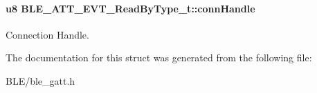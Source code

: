 \paragraph[{\texorpdfstring{conn\+Handle}{connHandle}}]{\setlength{\rightskip}{0pt plus 5cm}u8 B\+L\+E\+\_\+\+A\+T\+T\+\_\+\+E\+V\+T\+\_\+\+Read\+By\+Type\+\_\+t\+::conn\+Handle}\hypertarget{struct_b_l_e___a_t_t___e_v_t___read_by_type__t_abd47a7bd730cdcf9c1e88da75632d4cd}{}\label{struct_b_l_e___a_t_t___e_v_t___read_by_type__t_abd47a7bd730cdcf9c1e88da75632d4cd}
Connection Handle. 

The documentation for this struct was generated from the following file\+:\begin{DoxyCompactItemize}
\item 
B\+L\+E/ble\+\_\+gatt.\+h\end{DoxyCompactItemize}
